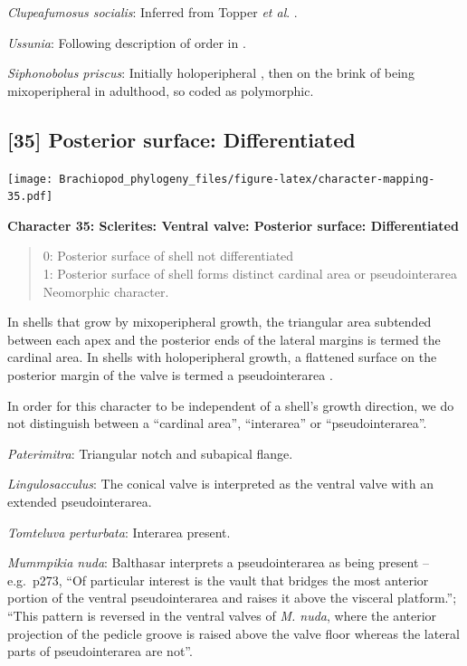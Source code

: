 \documentclass[]{book}
\theoremstyle{definition}
\theoremstyle{definition}
\theoremstyle{definition}
\theoremstyle{remark}
\begin{document}
\emph{Clupeafumosus socialis}: Inferred from Topper \emph{et al}.
\citeyearpar{Topper2013Reappraisalof}.

\emph{Ussunia}: Following description of order in
\citet{Williams2000BrachiopodaLinguliformea}.

\emph{Siphonobolus priscus}: Initially holoperipheral
\citep[p.~159]{Popov2009Earlyontogeny}, then on the brink of being
mixoperipheral in adulthood, so coded as polymorphic.

\hypertarget{posterior-surface-differentiated-1}{%
\subsection*{{[}35{]} Posterior surface:
Differentiated}\label{posterior-surface-differentiated-1}}

\texttt{[image: Brachiopod\_phylogeny\_files/figure-latex/character-mapping-35.pdf]}

\textbf{Character 35: Sclerites: Ventral valve: Posterior surface:
Differentiated}

\begin{quote}
0: Posterior surface of shell not differentiated\\
1: Posterior surface of shell forms distinct cardinal area or
pseudointerarea\\
Neomorphic character.
\end{quote}

In shells that grow by mixoperipheral growth, the triangular area
subtended between each apex and the posterior ends of the lateral
margins is termed the cardinal area. In shells with holoperipheral
growth, a flattened surface on the posterior margin of the valve is
termed a pseudointerarea
\citep[paraphrasing][]{Williams1997BrachiopodaRevised}.

In order for this character to be independent of a shell's growth
direction, we do not distinguish between a ``cardinal area'',
``interarea'' or ``pseudointerarea''.

\emph{Paterimitra}: Triangular notch and subapical flange.

\emph{Lingulosacculus}: The conical valve is interpreted as the ventral
valve with an extended pseudointerarea.

\emph{Tomteluva perturbata}: Interarea present.

\emph{Mummpikia nuda}: Balthasar \citeyearpar{Balthasar2008iMummpikia}
interprets a pseudointerarea as being present -- e.g.~p273, ``Of
particular interest is the vault that bridges the most anterior portion
of the ventral pseudointerarea and raises it above the visceral
platform.''; ``This pattern is reversed in the ventral valves of
\emph{M. nuda}, where the anterior projection of the pedicle groove is
raised above the valve floor whereas the lateral parts of
pseudointerarea are not''.
\end{document}

